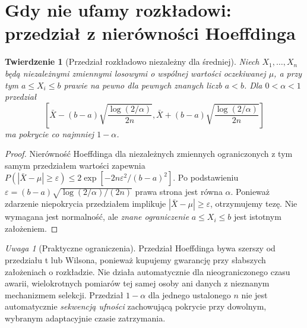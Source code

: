 \documentclass[11pt,a4paper,oneside]{report}
\numberwithin{equation}{chapter}
\theoremstyle{plain}
\newtheorem{twierdzenie}{Twierdzenie}[chapter]
\theoremstyle{definition}
\theoremstyle{remark}
\newtheorem{uwaga}{Uwaga}[chapter]
\begin{document}
\section{Gdy nie ufamy rozkładowi: przedział z nierówności Hoeffdinga}
\begin{twierdzenie}[Przedział rozkładowo niezależny dla średniej]
\label{thm:hoeffding-ci}
Niech $X_1,\ldots,X_n$ będą niezależnymi zmiennymi
losowymi o wspólnej wartości oczekiwanej $\mu$,
a przy tym $a\le X_i\le b$ prawie na pewno dla
pewnych znanych liczb $a<b$. Dla $0<\alpha<1$
przedział
\[
 \left[\bar X-(b-a)\sqrt{\frac{\log(2/\alpha)}{2n}},
       \bar X+(b-a)\sqrt{\frac{\log(2/\alpha)}{2n}}\right]
\]
ma pokrycie co najmniej $1-\alpha$.
\end{twierdzenie}
\begin{proof}
Nierówność Hoeffdinga dla niezależnych zmiennych
ograniczonych z tym samym przedziałem wartości zapewnia
$P(|\bar X-\mu|\ge\varepsilon)
\le2\exp[-2n\varepsilon^2/(b-a)^2]$.
Po podstawieniu
$\varepsilon=(b-a)\sqrt{\log(2/\alpha)/(2n)}$
prawa strona jest równa $\alpha$. Ponieważ zdarzenie
niepokrycia przedziałem implikuje
$|\bar X-\mu|\ge\varepsilon$, otrzymujemy tezę.
Nie wymagana jest normalność, ale \emph{znane ograniczenie}
$a\le X_i\le b$ jest istotnym założeniem.
\end{proof}

\begin{uwaga}[Praktyczne ograniczenia]
Przedział Hoeffdinga bywa szerszy od przedziału t lub Wilsona,
ponieważ kupujemy gwarancję przy słabszych założeniach
o rozkładzie. Nie działa automatycznie dla nieograniczonego
czasu awarii, wielokrotnych pomiarów tej samej osoby ani
danych z nieznanym mechanizmem selekcji.
Przedział $1-\alpha$ dla jednego ustalonego $n$ nie jest
automatycznie \emph{sekwencją ufności} zachowującą pokrycie
przy dowolnym, wybranym adaptacyjnie czasie zatrzymania.
\end{uwaga}
\end{document}
